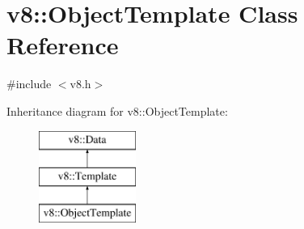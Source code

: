 \hypertarget{classv8_1_1ObjectTemplate}{\section{v8\-:\-:Object\-Template Class Reference}
\label{classv8_1_1ObjectTemplate}
}


{\ttfamily \#include $<$v8.\-h$>$}

Inheritance diagram for v8\-:\-:Object\-Template\-:\begin{figure}[H]
\begin{center}
\leavevmode
\includegraphics[height=3.000000cm]{classv8_1_1ObjectTemplate}
\end{center}
\end{figure}
